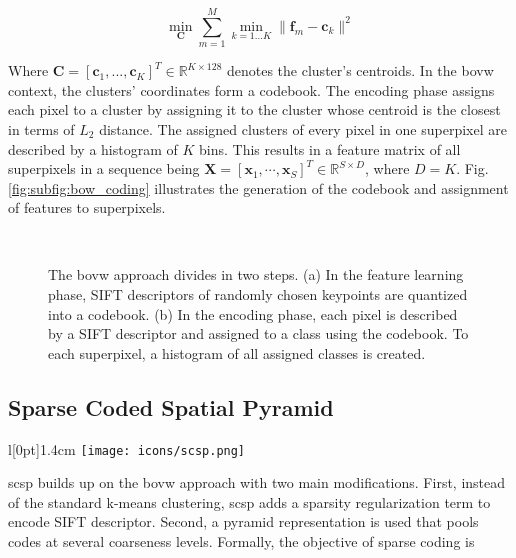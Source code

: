 \begin{equation}
   \min_{\boldsymbol{C}} \sum_{m=1}^M \min_{k=1...K} \|\boldsymbol{f}_m - \boldsymbol{c}_k\|^2
   \label{eq:k_means} 
\end{equation}
\vspace{6pt}

Where $\boldsymbol{C} = [\boldsymbol{c}_1,...,\boldsymbol{c}_K]^T \in \mathbb{R}^{K \times 128}$ denotes the cluster's centroids.
In the \gls{bovw} context, the clusters' coordinates form a codebook.
The encoding phase assigns each pixel to a cluster by assigning it to the cluster whose centroid is the closest in terms of $L_{2}$ distance.
The assigned clusters of every pixel in one superpixel are described by a histogram of $K$ bins.
This results in a feature matrix of all superpixels in a sequence being $\boldsymbol{X} = [\boldsymbol{x}_1,\cdots,\boldsymbol{x}_S]^T \in \mathbb{R}^{S \times D}$, where $D = K$.
Fig. \ref{fig:subfig:bow_coding} illustrates the generation of the codebook and assignment of features to superpixels.

\begin{figure}[htbp]
  \centering
  \\
  \caption[BoVW illustration]{The \gls{bovw} approach divides in two steps.
    (a) In the feature learning phase, SIFT descriptors of randomly chosen keypoints are quantized into a codebook.
    (b) In the encoding phase, each pixel is described by a SIFT descriptor and assigned to a class using the codebook.
    To each superpixel, a histogram of all assigned classes is created.}
  \label{fig:BoVW_approch}  
\end{figure}

\subsection{Sparse Coded Spatial Pyramid} \label{scp}
\begingroup
\setlength\intextsep{0pt}
\begin{wrapfigure}[4]{l}[0pt]{1.4cm}
\texttt{[image: icons/scsp.png]}
\end{wrapfigure}

\gls{scsp} \cite{lazebnik09} builds up on the \gls{bovw} approach with two main modifications.
First, instead of the standard k-means clustering, \gls{scsp} adds a sparsity regularization term to encode SIFT descriptor.
Second, a pyramid representation is used that pools codes at several coarseness levels.
Formally, the objective of sparse coding is

